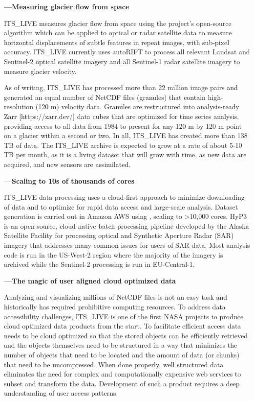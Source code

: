 \documentclass[
  super,
  preprint,
  3p,
  twocolumn]{elsarticle}
\begin{document}
\textbf{---Measuring glacier flow from space}

ITS\_LIVE measures glacier flow from space using the project's
open-source \citep[autoRIFT][]{Lei2021-nu, Gardner2018-eu} algorithm
which can be applied to optical or radar satellite data to measure
horizontal displacements of subtle features in repeat images, with
sub-pixel accuracy. ITS\_LIVE currently uses autoRIFT to process all
relevant Landsat and Sentinel-2 optical satellite imagery and all
Sentinel-1 radar satellite imagery to measure glacier velocity.

As of writing, ITS\_LIVE has processed more than 22 million image pairs
and generated an equal number of NetCDF files (granules) that contain
high-resolution (120 m) velocity data. Granules are restructured into
analysis-ready Zarr {[}https://zarr.dev/{]} data cubes that are
optimized for time series analysis, providing access to all data from
1984 to present for any 120 m by 120 m point on a glacier within a
second or two. In all, ITS\_LIVE has created more than 138 TB of data.
The ITS\_LIVE archive is expected to grow at a rate of about 5-10 TB per
month, as it is a living dataset that will grow with time, as new data
are acquired, and new sensors are assimilated.

\textbf{---Scaling to 10s of thousands of cores}

ITS\_LIVE data processing uses a cloud-first approach to minimize
downloading of data and to optimize for rapid data access and
large-scale analysis. Dataset generation is carried out in Amazon AWS
using \citep[HyP3][]{Hogenson2023-cj} , scaling to \textgreater10,000
cores. HyP3 is an open-source, cloud-native batch processing pipeline
developed by the Alaska Satellite Facility for processing optical and
Synthetic Aperture Radar (SAR) imagery that addresses many common issues
for users of SAR data. Most analysis code is run in the US-West-2 region
where the majority of the imagery is archived while the Sentinel-2
processing is run in EU-Central-1.

\textbf{---The magic of user aligned cloud optimized data}

Analyzing and visualizing millions of NetCDF files is not an easy task
and historically has required prohibitive computing resources. To
address data accessibility challenges, ITS\_LIVE is one of the first
NASA projects to produce cloud optimized data products from the start.
To facilitate efficient access data needs to be cloud optimized so that
the stored objects can be efficiently retrieved and the objects
themselves need to be structured in a way that minimizes the number of
objects that need to be located and the amount of data (or chunks) that
need to be uncompressed. When done properly, well structured data
eliminates the need for complex and computationally expensive web
services to subset and transform the data. Development of such a product
requires a deep understanding of user access patterns.
\end{document}
